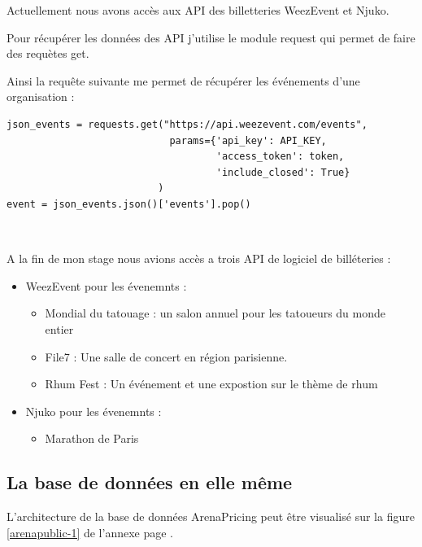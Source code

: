 Actuellement nous avons accès aux API des billetteries WeezEvent et Njuko. 

Pour récupérer les données des API j'utilise le module request qui permet de faire des requètes get.

Ainsi la requête suivante me permet de récupérer les événements d'une organisation :

\lstset{style=custompython}
\begin{lstlisting}
json_events = requests.get("https://api.weezevent.com/events",
                            params={'api_key': API_KEY,
                                    'access_token': token,
                                    'include_closed': True}
                          )
event = json_events.json()['events'].pop()
\end{lstlisting}
\leavevmode \

A la fin de mon stage nous avions accès a trois API de logiciel de billéteries : 
\begin{itemize}
  \item[\textbullet] WeezEvent pour les évenemnts :
  \begin{itemize}
	\item Mondial du tatouage : un salon annuel pour les tatoueurs du monde entier
	\item File7 : Une salle de concert en région parisienne. 
	\item Rhum Fest : Un événement et une expostion sur le thème de rhum
  \end{itemize}
  \item[\textbullet] Njuko pour les évenemnts :
  \begin{itemize}
  	\item Marathon de Paris
  \end{itemize}

\end{itemize}

\subsection{La base de données en elle même}
L'architecture de la base de données ArenaPricing peut être visualisé sur la figure \ref{arenapublic-1} de l'annexe page \pageref{arenapublic-1}.



		